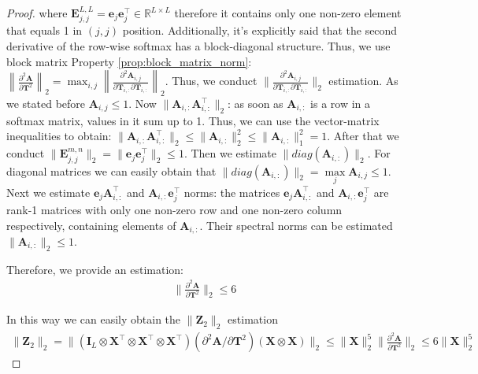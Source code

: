 \documentclass{article}
\begin{document}
\begin{proof}
where $\mathbf{E}_{j,j}^{L, L} = \mathbf{e}_j \mathbf{e}_j^{\top} \in \mathbb{R}^{L \times L}$ therefore it contains only one non-zero element that equals 1 in $(j, j)$ position. Additionally, it's explicitly said that the second derivative of the row-wise softmax has a block-diagonal structure. Thus, we use block matrix Property \ref{prop:block_matrix_norm}: $\left\|\frac{\partial^2 \mathbf{A}}{\partial \mathbf{T}^2}\right\|_2 = \max_{i,j} \left\|\frac{\partial^2 \mathbf{A}_{i,j}}{\partial \mathbf{T}_{i,:} \partial \mathbf{T}_{i,:}}\right\|_2$. Thus, we conduct $\|\frac{\partial^2 \mathbf{A}_{i,j}}{\partial \mathbf{T}_{i,:} \partial \mathbf{T}_{i,:}} \|_2$ estimation. As we stated before $\mathbf{A}_{i,j} \leq 1$. Now $\| \mathbf{A}_{i,:}\mathbf{A}_{i,:}^{\top} \|_2$: as soon as $\mathbf{A}_{i,:}$ is a row in a softmax matrix, values in it sum up to 1. Thus, we can use the vector-matrix inequalities to obtain: $\| \mathbf{A}_{i,:}\mathbf{A}_{i,:}^{\top} \|_2 \leq \|\mathbf{A}_{i,:}\|^2_2 \leq \|\mathbf{A}_{i,:}\|_1^2 = 1$. After that we conduct $ \|\mathbf{E}_{j,j}^{m,n}\|_2 = \| \mathbf{e}_j \mathbf{e}_j^{\top}\|_2 \leq 1$. Then we estimate $\|diag(\mathbf{A}_{i,:})\|_2$. For diagonal matrices we can easily obtain that $\|diag(\mathbf{A}_{i,:})\|_2 = \max \limits_j \mathbf{A}_{i,j} \leq 1$. Next we estimate $\mathbf{e}_j \mathbf{A}_{i,:}^{\top}$ and $\mathbf{A}_{i,:}\mathbf{e}_j^{\top}$ norms: the matrices $\mathbf{e}_j \mathbf{A}_{i,:}^{\top}$ and $\mathbf{A}_{i,:}\mathbf{e}_j^{\top}$ are rank-1 matrices with only one non-zero row and one non-zero column respectively, containing elements of $\mathbf{A}_{i,:}$. Their spectral norms can be estimated $\|\mathbf{A}_{i,:}\|_2 \leq 1$.

Therefore, we provide an estimation:
\begin{align*}
    \| \frac{\partial^2 \mathbf{A}}{\partial \mathbf{T}^2} \|_2 \leq 6 
\end{align*}

In this way we can easily obtain the $\| \mathbf{Z}_2 \|_2$ estimation
\begin{align*}
    \| \mathbf{Z}_2 \|_2 = \| \left(\mathbf{I}_L \otimes \mathbf{X}^\top \otimes \mathbf{X}^\top \otimes \mathbf{X}^\top\right) \left(\partial^2\mathbf{A}/\partial\mathbf{T}^2\right) \left(\mathbf{X} \otimes \mathbf{X}\right) \|_2 \leq \| \mathbf{X}\|^5_2 \| \frac{\partial^2\mathbf{A}}{\partial\mathbf{T}^2} \|_2 \leq 6 \| \mathbf{X}\|^5_2
\end{align*}


\end{proof}
\end{document}
